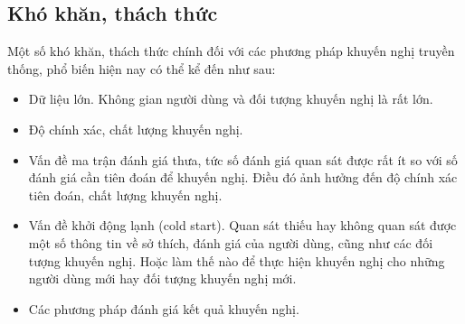 \subsection{Khó khăn, thách thức}
Một số khó khăn, thách thức chính đối với các phương pháp khuyến nghị truyền thống, phổ biến hiện nay có thể kể đến như sau:
\begin{itemize}
\item Dữ liệu lớn. Không gian người dùng và đối tượng khuyến nghị là rất lớn.
\item Độ chính xác, chất lượng khuyến nghị.
\item Vấn đề ma trận đánh giá thưa, tức số đánh giá quan sát được rất ít so với số đánh giá cần tiên đoán để khuyến nghị. Điều đó ảnh hưởng đến độ chính xác tiên đoán, chất lượng khuyến nghị.
\item Vấn đề khởi động lạnh (cold start). Quan sát thiếu hay không quan sát được một số thông tin về sở thích, đánh giá của người dùng, cũng như các đối tượng khuyến nghị. Hoặc làm thế nào để thực hiện khuyến nghị cho những người dùng mới hay đối tượng khuyến nghị mới.
\item Các phương pháp đánh giá kết quả khuyến nghị.

\end{itemize}
